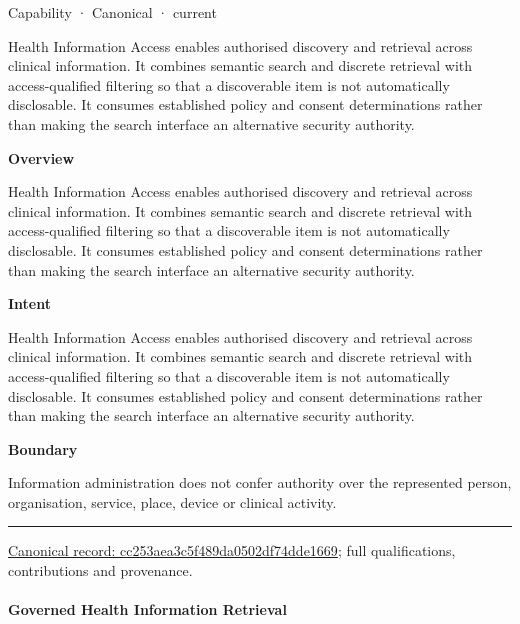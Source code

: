 \label{element:cc253aea3c5f489da0502df74dde1669}
{\small Capability · Canonical · current}\par

Health Information Access enables authorised discovery and retrieval across clinical information. It combines semantic search and discrete retrieval with access-qualified filtering so that a discoverable item is not automatically disclosable. It consumes established policy and consent determinations rather than making the search interface an alternative security authority.



\textbf{Overview}



Health Information Access enables authorised discovery and retrieval across clinical information. It combines semantic search and discrete retrieval with access-qualified filtering so that a discoverable item is not automatically disclosable. It consumes established policy and consent determinations rather than making the search interface an alternative security authority.



\textbf{Intent}



Health Information Access enables authorised discovery and retrieval across clinical information. It combines semantic search and discrete retrieval with access-qualified filtering so that a discoverable item is not automatically disclosable. It consumes established policy and consent determinations rather than making the search interface an alternative security authority.



\textbf{Boundary}



Information administration does not confer authority over the represented person, organisation, service, place, device or clinical activity.



\medskip\hrule\medskip

{\footnotesize \href{../../../../continuum/strategy/capability/cc253aea3c5f489da0502df74dde1669.md}{Canonical record: cc253aea3c5f489da0502df74dde1669}; full qualifications, contributions and provenance.}\par
\paragraph{Governed Health Information Retrieval}

